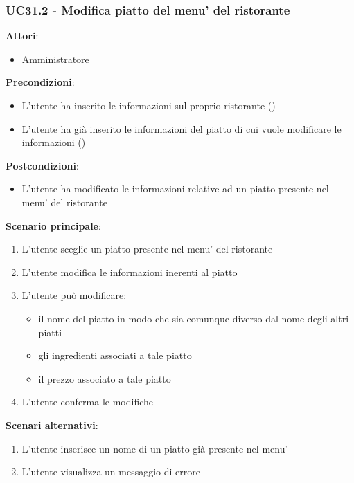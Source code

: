 \subsubsection{UC31.2 - Modifica piatto del menu' del ristorante}\label{usecase:31_2}
\textbf{Attori}:
\begin{itemize}
    \item Amministratore
\end{itemize}
\textbf{Precondizioni}:
\begin{itemize}
    \item L'utente ha inserito le informazioni sul proprio ristorante ()
    \item L'utente ha già inserito le informazioni del piatto di cui vuole modificare le informazioni ()
\end{itemize}
\textbf{Postcondizioni}:
\begin{itemize}
    \item L'utente ha modificato le informazioni relative ad un piatto presente nel menu' del ristorante
\end{itemize}
\textbf{Scenario principale}:
\begin{enumerate}
    \item L'utente sceglie un piatto presente nel menu' del ristorante
    \item L'utente modifica le informazioni inerenti al piatto
    \item L'utente può modificare:
    \begin{itemize}
        \item il nome del piatto in modo che sia comunque diverso dal nome degli altri piatti
        \item gli ingredienti associati a tale piatto
        \item il prezzo associato a tale piatto
    \end{itemize}
    \item L'utente conferma le modifiche
\end{enumerate}
\textbf{Scenari alternativi}:
\begin{enumerate}
    \item L’utente inserisce un nome di un piatto già presente nel menu’
    \item L'utente visualizza un messaggio di errore
\end{enumerate}